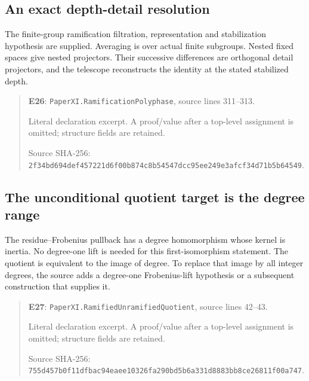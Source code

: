 \documentclass[10pt,oneside]{book}
\begin{document}
\subsection{An exact depth-detail resolution}
\label{guide:E26}
The finite-group ramification filtration, representation and stabilization hypothesis are supplied. Averaging is over actual finite subgroups.
Nested fixed spaces give nested projectors. Their successive differences are orthogonal detail projectors, and the telescope reconstructs the identity at the stated stabilized depth.

\begin{quote}\footnotesize\textbf{E26}: \nolinkurl{PaperXI.RamificationPolyphase}, source lines 311--313.\par Literal declaration excerpt. A proof/value after a top-level assignment is omitted; structure fields are retained.\par Source SHA-256: {\scriptsize\texttt{2f34bd694def457221d6f00b874c8b54547dcc95ee249e3afcf34d71b5b64549}}.\end{quote}


\subsection{The unconditional quotient target is the degree range}
\label{guide:E27}
The residue--Frobenius pullback has a degree homomorphism whose kernel is inertia. No degree-one lift is needed for this first-isomorphism statement.
The quotient is equivalent to the image of degree. To replace that image by all integer degrees, the source adds a degree-one Frobenius-lift hypothesis or a subsequent construction that supplies it.

\begin{quote}\footnotesize\textbf{E27}: \nolinkurl{PaperXI.RamifiedUnramifiedQuotient}, source lines 42--43.\par Literal declaration excerpt. A proof/value after a top-level assignment is omitted; structure fields are retained.\par Source SHA-256: {\scriptsize\texttt{755d457b0f11dfbac94eaee10326fa290bd5b6a331d8883bb8ce26811f00a747}}.\end{quote}

\end{document}
